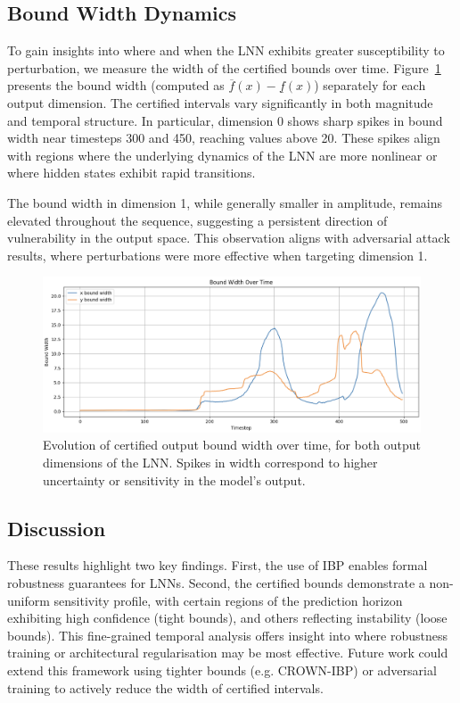 \subsection*{Bound Width Dynamics}

To gain insights into where and when the LNN exhibits greater susceptibility to perturbation, we measure the width of the certified bounds over time. Figure~\ref{fig:bound_width_plot} presents the bound width (computed as \( \overline{f}(x) - \underline{f}(x) \)) separately for each output dimension. The certified intervals vary significantly in both magnitude and temporal structure. In particular, dimension 0 shows sharp spikes in bound width near timesteps 300 and 450, reaching values above 20. These spikes align with regions where the underlying dynamics of the LNN are more nonlinear or where hidden states exhibit rapid transitions.

The bound width in dimension 1, while generally smaller in amplitude, remains elevated throughout the sequence, suggesting a persistent direction of vulnerability in the output space. This observation aligns with adversarial attack results, where perturbations were more effective when targeting dimension 1.

\begin{figure}[H]
    \centering
    \includegraphics[width=0.9\linewidth]{img/bound_width_over_time.png}
    \caption{Evolution of certified output bound width over time, for both output dimensions of the LNN. Spikes in width correspond to higher uncertainty or sensitivity in the model's output.}
    \label{fig:bound_width_plot}
\end{figure}

\subsection*{Discussion}

These results highlight two key findings. First, the use of IBP enables formal robustness guarantees for LNNs. Second, the certified bounds demonstrate a non-uniform sensitivity profile, with certain regions of the prediction horizon exhibiting high confidence (tight bounds), and others reflecting instability (loose bounds). This fine-grained temporal analysis offers insight into where robustness training or architectural regularisation may be most effective. Future work could extend this framework using tighter bounds (e.g. CROWN-IBP) or adversarial training to actively reduce the width of certified intervals.